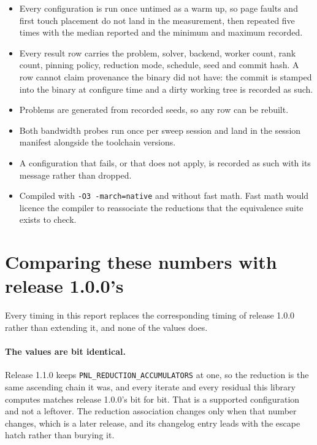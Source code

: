 \begin{itemize}
  \item Every configuration is run once untimed as a warm up, so page faults and
        first touch placement do not land in the measurement, then repeated five
        times with the median reported and the minimum and maximum recorded.
  \item Every result row carries the problem, solver, backend, worker count,
        rank count, pinning policy, reduction mode, schedule, seed and commit
        hash. A row cannot claim provenance the binary did not have: the commit
        is stamped into the binary at configure time and a dirty working tree is
        recorded as such.
  \item Problems are generated from recorded seeds, so any row can be rebuilt.
  \item Both bandwidth probes run once per sweep session and land in the session
        manifest alongside the toolchain versions.
  \item A configuration that fails, or that does not apply, is recorded as such
        with its message rather than dropped.
  \item Compiled with \texttt{-O3 -march=native} and without fast math. Fast math
        would licence the compiler to reassociate the reductions that the
        equivalence suite exists to check.
\end{itemize}

\section{Comparing these numbers with release 1.0.0's}
\label{sec:across-releases}

Every timing in this report replaces the corresponding timing of release 1.0.0
rather than extending it, and none of the values does.

\paragraph{The values are bit identical.} Release 1.1.0 keeps
\texttt{PNL\_REDUCTION\_ACCUMULATORS} at one, so the reduction is the same
ascending chain it was, and every iterate and every residual this library
computes matches release 1.0.0's bit for bit. That is a supported configuration
and not a leftover. The reduction association changes only when that number
changes, which is a later release, and its changelog entry leads with the escape
hatch rather than burying it.

